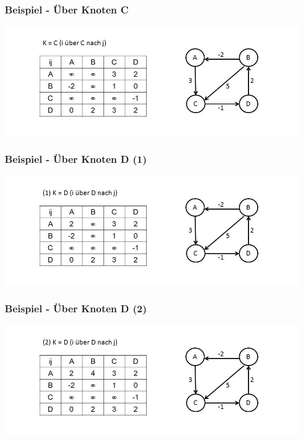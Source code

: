 
\begin{frame}
\frametitle{Beispiel - Über Knoten C}

\includegraphics[width=\linewidth]{floyd_warshall_graphs/graph4.JPG}

\end{frame}


\begin{frame}
\frametitle{Beispiel - Über Knoten D (1)}

\includegraphics[width=\linewidth]{floyd_warshall_graphs/graph5.JPG}

\end{frame}


\begin{frame}
\frametitle{Beispiel - Über Knoten D (2)}

\includegraphics[width=\linewidth]{floyd_warshall_graphs/graph6.JPG}

\end{frame}

